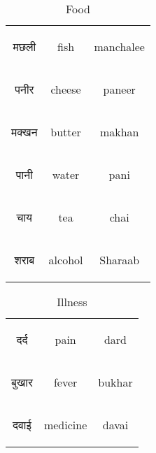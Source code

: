 \begin{table}[H]
\begin{tabular}{c|c|c}
        \begin{hindi} मछली \end{hindi} & fish & manchalee \\  
        \begin{hindi} पनीर \end{hindi} & cheese & paneer \\  
        \begin{hindi} मक्खन \end{hindi} & butter & makhan \\  
        \begin{hindi} पानी \end{hindi} & water & pani \\
        \begin{hindi} चाय \end{hindi} & tea & chai \\
        \begin{hindi} शराब \end{hindi} & alcohol & Sharaab \\

    \end{tabular}
    \caption{Food}
    \label{tab:nouns_food}
\end{table}

\begin{table}[H]
    \centering
    \begin{tabular}{c|c|c}
        \begin{hindi} दर्द \end{hindi} & pain & dard \\  
        \begin{hindi} बुखार \end{hindi} & fever & bukhar \\  
        \begin{hindi} दवाई \end{hindi} & medicine & davai \\ 
    \end{tabular}
    \caption{Illness}
    \label{tab:nouns_illness}
\end{table}

